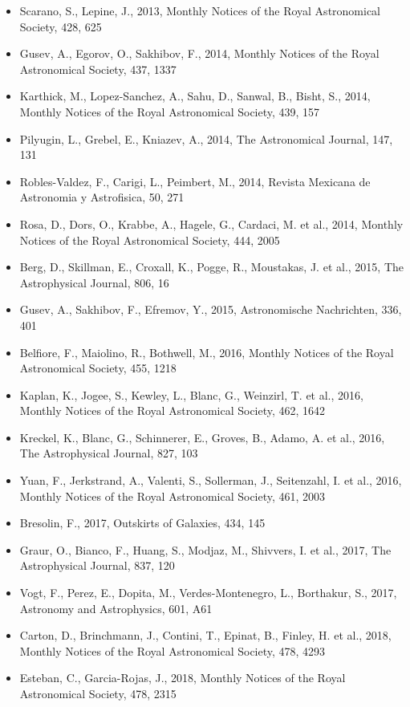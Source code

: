 \documentclass{letter}
\begin{document}
\begin{enumerate}
\begin{itemize}
\item Scarano, S., Lepine, J., 2013, Monthly Notices of the Royal Astronomical Society, 428, 625
\item Gusev, A., Egorov, O., Sakhibov, F., 2014, Monthly Notices of the Royal Astronomical Society, 437, 1337
\item Karthick, M., Lopez-Sanchez, A., Sahu, D., Sanwal, B., Bisht, S., 2014, Monthly Notices of the Royal Astronomical Society, 439, 157
\item Pilyugin, L., Grebel, E., Kniazev, A., 2014, The Astronomical Journal, 147, 131
\item Robles-Valdez, F., Carigi, L., Peimbert, M., 2014, Revista Mexicana de Astronomia y Astrofisica, 50, 271
\item Rosa, D., Dors, O., Krabbe, A., Hagele, G., Cardaci, M. et al., 2014, Monthly Notices of the Royal Astronomical Society, 444, 2005
\item Berg, D., Skillman, E., Croxall, K., Pogge, R., Moustakas, J. et al., 2015, The Astrophysical Journal, 806, 16
\item Gusev, A., Sakhibov, F., Efremov, Y., 2015, Astronomische Nachrichten, 336, 401
\item Belfiore, F., Maiolino, R., Bothwell, M., 2016, Monthly Notices of the Royal Astronomical Society, 455, 1218
\item Kaplan, K., Jogee, S., Kewley, L., Blanc, G., Weinzirl, T. et al., 2016, Monthly Notices of the Royal Astronomical Society, 462, 1642
\item Kreckel, K., Blanc, G., Schinnerer, E., Groves, B., Adamo, A. et al., 2016, The Astrophysical Journal, 827, 103
\item Yuan, F., Jerkstrand, A., Valenti, S., Sollerman, J., Seitenzahl, I. et al., 2016, Monthly Notices of the Royal Astronomical Society, 461, 2003
\item Bresolin, F., 2017, Outskirts of Galaxies, 434, 145
\item Graur, O., Bianco, F., Huang, S., Modjaz, M., Shivvers, I. et al., 2017, The Astrophysical Journal, 837, 120
\item Vogt, F., Perez, E., Dopita, M., Verdes-Montenegro, L., Borthakur, S., 2017, Astronomy and Astrophysics, 601, A61
\item Carton, D., Brinchmann, J., Contini, T., Epinat, B., Finley, H. et al., 2018, Monthly Notices of the Royal Astronomical Society, 478, 4293
\item Esteban, C., Garcia-Rojas, J., 2018, Monthly Notices of the Royal Astronomical Society, 478, 2315

\end{itemize}
\end{enumerate}
\end{document}
